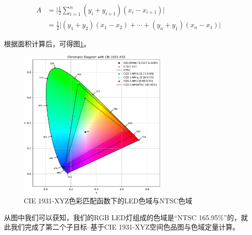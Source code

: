 \begin{equation}
    \begin{aligned}
        A &= \lvert\frac 1 2 \sum_{i=1}^n (y_i + y_{i+1})(x_i - x_{i+1})\rvert\\
          &= \frac 1 2 \lvert(y_1+y_2)(x_1-x_2)+ \cdots +(y_n+y_1)(x_n-x_1)\rvert
    \end{aligned}
    \label{eq:Shoelace}
\end{equation}

根据面积计算后，可得图\ref{fig:sd1931-ledwithntsc}。

\begin{figure}[htbp]
    \centering
    \includegraphics[width=0.65\textwidth]{./imgs/sec3/CQS-1-NM-1931-sd.pdf}
    \caption{CIE 1931-XYZ色彩匹配函数下的LED色域与NTSC色域}
    \label{fig:sd1931-ledwithntsc}
\end{figure}

从图中我们可以获知，我们的RGB LED灯组成的色域是``NTSC 165.95\%''的，就此我们完成了第二个子目标--基于CIE 1931-XYZ空间色品图与色域定量计算。
